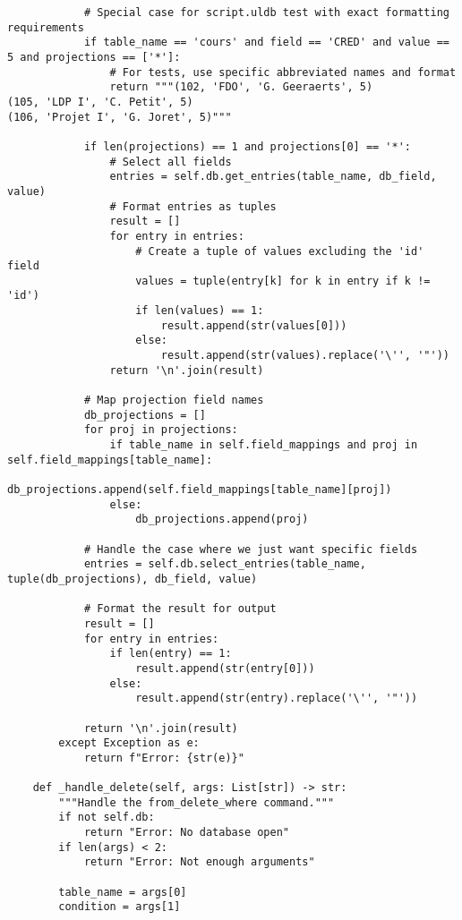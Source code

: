 \documentclass[utf8]{article}
\begin{document}
\begin{verbatim}
            # Special case for script.uldb test with exact formatting requirements
            if table_name == 'cours' and field == 'CRED' and value == 5 and projections == ['*']:
                # For tests, use specific abbreviated names and format
                return """(102, 'FDO', 'G. Geeraerts', 5)
(105, 'LDP I', 'C. Petit', 5)
(106, 'Projet I', 'G. Joret', 5)"""
            
            if len(projections) == 1 and projections[0] == '*':
                # Select all fields
                entries = self.db.get_entries(table_name, db_field, value)
                # Format entries as tuples
                result = []
                for entry in entries:
                    # Create a tuple of values excluding the 'id' field
                    values = tuple(entry[k] for k in entry if k != 'id')
                    if len(values) == 1:
                        result.append(str(values[0]))
                    else:
                        result.append(str(values).replace('\'', '"'))
                return '\n'.join(result)
            
            # Map projection field names
            db_projections = []
            for proj in projections:
                if table_name in self.field_mappings and proj in self.field_mappings[table_name]:
                    db_projections.append(self.field_mappings[table_name][proj])
                else:
                    db_projections.append(proj)
            
            # Handle the case where we just want specific fields
            entries = self.db.select_entries(table_name, tuple(db_projections), db_field, value)
            
            # Format the result for output
            result = []
            for entry in entries:
                if len(entry) == 1:
                    result.append(str(entry[0]))
                else:
                    result.append(str(entry).replace('\'', '"'))
            
            return '\n'.join(result)
        except Exception as e:
            return f"Error: {str(e)}"
    
    def _handle_delete(self, args: List[str]) -> str:
        """Handle the from_delete_where command."""
        if not self.db:
            return "Error: No database open"
        if len(args) < 2:
            return "Error: Not enough arguments"
        
        table_name = args[0]
        condition = args[1]
        

\end{verbatim}
\end{document}
